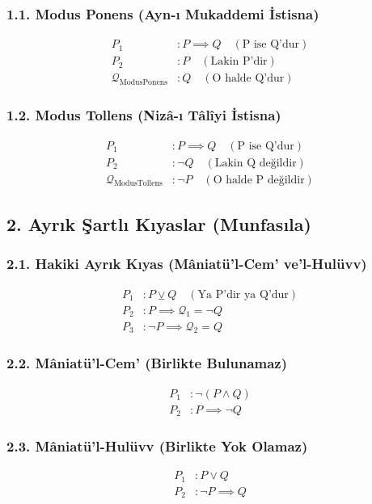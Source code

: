 \documentclass[11pt, a4paper]{article}
\begin{document}
\subsubsection{1.1. Modus Ponens (Ayn-ı Mukaddemi İstisna)}
\begin{align}
P_1 &: P \implies Q \quad (\text{P ise Q'dur}) \\
P_2 &: P \quad (\text{Lakin P'dir}) \\
\mathcal{Q}_{\text{ModusPonens}} &: Q \quad (\text{O halde Q'dur})
\end{align}

\subsubsection{1.2. Modus Tollens (Nizâ-ı Tâlîyi İstisna)}
\begin{align}
P_1 &: P \implies Q \quad (\text{P ise Q'dur}) \\
P_2 &: \neg Q \quad (\text{Lakin Q değildir}) \\
\mathcal{Q}_{\text{ModusTollens}} &: \neg P \quad (\text{O halde P değildir})
\end{align}

\subsection{2. Ayrık Şartlı Kıyaslar (Munfasıla)}

\subsubsection{2.1. Hakiki Ayrık Kıyas (Mâniatü'l-Cem' ve'l-Hulüvv)}
\begin{align}
P_1 &: P \veebar Q \quad (\text{Ya P'dir ya Q'dur}) \\
P_2 &: P \implies \mathcal{Q}_1 = \neg Q \\
P_3 &: \neg P \implies \mathcal{Q}_2 = Q
\end{align}

\subsubsection{2.2. Mâniatü'l-Cem' (Birlikte Bulunamaz)}
\begin{align}
P_1 &: \neg (P \land Q) \\
P_2 &: P \implies \neg Q
\end{align}

\subsubsection{2.3. Mâniatü'l-Hulüvv (Birlikte Yok Olamaz)}
\begin{align}
P_1 &: P \lor Q \\
P_2 &: \neg P \implies Q
\end{align}
\end{document}
